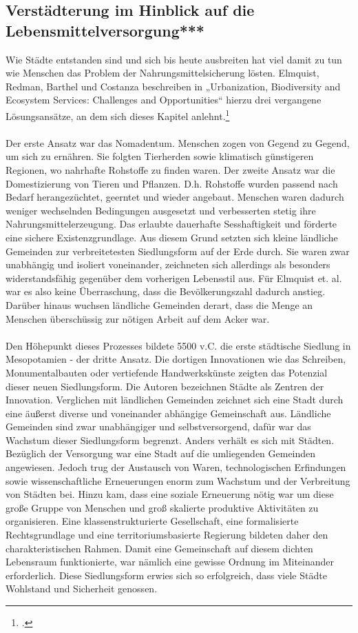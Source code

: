 \documentclass{scrartcl}
\begin{document}
\subsection{Verstädterung im Hinblick auf die Lebensmittelversorgung***}
Wie Städte entstanden sind und sich bis heute ausbreiten hat viel damit zu tun wie Menschen das Problem der Nahrungsmittelsicherung lösten. Elmquist, Redman, Barthel und Costanza beschreiben in „Urbanization, Biodiversity and Ecosystem Services: Challenges and Opportunities“ hierzu drei vergangene Lösungsansätze, an dem sich dieses Kapitel anlehnt.\footcite[S.14ff]{Elmqvist2013} 
\\
\\ 
Der erste Ansatz war das Nomadentum. Menschen zogen von Gegend zu Gegend, um sich zu ernähren. Sie folgten Tierherden sowie klimatisch günstigeren Regionen, wo nahrhafte Rohstoffe zu finden waren. Der zweite Ansatz war die Domestizierung von Tieren und Pflanzen. D.h. Rohstoffe wurden passend nach Bedarf herangezüchtet, geerntet und wieder angebaut. Menschen waren dadurch weniger wechselnden Bedingungen ausgesetzt und verbesserten stetig ihre Nahrungsmittelerzeugung. Das erlaubte dauerhafte Sesshaftigkeit und förderte eine sichere Existenzgrundlage. Aus diesem Grund setzten sich kleine ländliche Gemeinden zur verbreitetesten Siedlungsform auf der Erde durch. Sie waren zwar unabhängig und isoliert voneinander, zeichneten sich allerdings als besonders widerstandsfähig gegenüber dem vorherigen Lebensstil aus. Für Elmquist et. al. war es also keine Überraschung, dass die Bevölkerungszahl dadurch anstieg. Darüber hinaus wuchsen ländliche Gemeinden derart, dass die Menge an Menschen überschüssig zur nötigen Arbeit auf dem Acker war. \\
\\
Den Höhepunkt dieses Prozesses bildete 5500 v.C. die erste städtische Siedlung in Mesopotamien - der dritte Ansatz. Die dortigen Innovationen wie das Schreiben, Monumentalbauten oder vertiefende Handwerkskünste zeigten das Potenzial dieser neuen Siedlungsform. Die Autoren bezeichnen Städte als Zentren der Innovation. Verglichen mit ländlichen Gemeinden zeichnet sich eine Stadt durch eine äußerst diverse und voneinander abhängige Gemeinschaft aus. Ländliche Gemeinden sind zwar unabhängiger und selbstversorgend, dafür war das Wachstum dieser Siedlungsform begrenzt. Anders verhält es sich mit Städten. Bezüglich der Versorgung war eine Stadt auf die umliegenden Gemeinden angewiesen. Jedoch trug der Austausch von Waren, technologischen Erfindungen sowie wissenschaftliche Erneuerungen enorm zum Wachstum und der Verbreitung von Städten bei. Hinzu kam, dass eine soziale Erneuerung nötig war um diese große Gruppe von Menschen und groß skalierte produktive Aktivitäten zu organisieren. Eine klassenstrukturierte Gesellschaft, eine formalisierte Rechtsgrundlage und eine territoriumsbasierte Regierung bildeten daher den charakteristischen Rahmen. Damit eine Gemeinschaft auf diesem dichten Lebensraum funktionierte, war nämlich eine gewisse Ordnung im Miteinander erforderlich. Diese Siedlungsform erwies sich so erfolgreich, dass viele Städte Wohlstand und Sicherheit genossen. 
\end{document}
